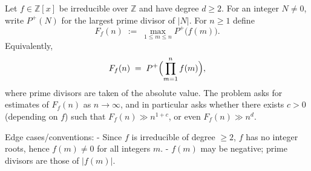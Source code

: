 Let $f\in\mathbb Z[x]$ be irreducible over $\mathbb Z$ and have degree $d\ge 2$.
For an integer $N\ne 0$, write $P^+(N)$ for the largest prime divisor of $|N|$.
For $n\ge 1$ define
\[
F_f(n)\;:=\;\max_{1\le m\le n} P^+\bigl(f(m)\bigr).
\]
Equivalently,
\[
F_f(n)\;=\; P^+\Bigl(\prod_{m=1}^n f(m)\Bigr),
\]
where prime divisors are taken of the absolute value.
The problem asks for estimates of $F_f(n)$ as $n\to\infty$, and in particular asks whether
there exists $c>0$ (depending on $f$) such that $F_f(n)\gg n^{1+c}$, or even $F_f(n)\gg n^d$.

Edge cases/conventions:
- Since $f$ is irreducible of degree $\ge 2$, $f$ has no integer roots, hence $f(m)\ne 0$ for all integers $m$.
- $f(m)$ may be negative; prime divisors are those of $|f(m)|$.
